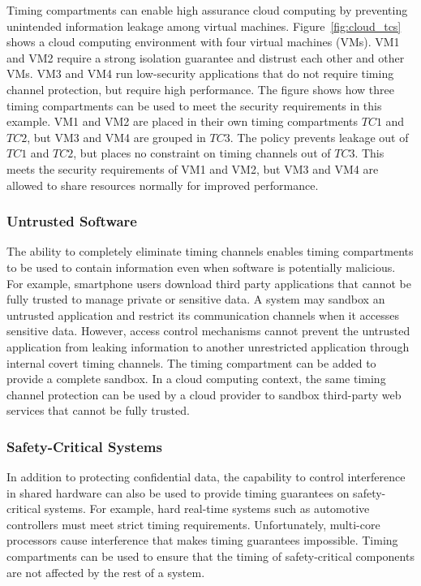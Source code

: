 Timing compartments can enable high assurance cloud computing by preventing
unintended information leakage among virtual machines.
Figure~\ref{fig:cloud_tcs} shows a cloud computing environment with four virtual 
machines (VMs).
VM1 and VM2 require a strong isolation guarantee and distrust each other and 
other VMs.
VM3 and VM4 run low-security applications that do not require timing channel 
protection, but require high performance. The figure shows how three timing 
compartments can be used to meet the security requirements in this example.
VM1 and VM2 are placed in their own timing compartments $TC1$ and $TC2$, but VM3 
and VM4 are grouped in $TC3$. The policy prevents leakage out of $TC1$ and 
$TC2$, but places no constraint on timing channels out of $TC3$. This meets the 
security requirements of VM1 and VM2, but VM3 and VM4 are allowed to share 
resources normally for improved performance.


\subsubsection{Untrusted Software} 

The ability to completely eliminate timing channels enables timing compartments
to be used to contain information even when software is potentially malicious.
For example, smartphone users download third party applications
that cannot be fully trusted to manage private or sensitive data. A system may
sandbox an untrusted application and restrict its communication channels
when it accesses sensitive data. However, access control mechanisms cannot
prevent the untrusted application from leaking information to another 
unrestricted
application through internal covert timing channels. The timing compartment can 
be added to provide a complete sandbox.  In a cloud computing
context, the same timing channel protection can be used
by a cloud provider to sandbox third-party web services that cannot be fully 
trusted.

\subsubsection{Safety-Critical Systems}

In addition to protecting confidential data, the capability to control 
interference in shared hardware can also be used to provide timing guarantees on 
safety-critical systems. For example, hard real-time systems such as automotive 
controllers must meet strict timing requirements. Unfortunately, multi-core
processors cause interference that makes timing guarantees impossible. Timing
compartments can be used to ensure that the timing of safety-critical components 
are not affected by the rest of a system.

